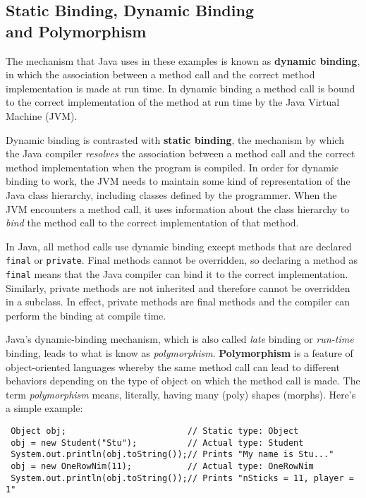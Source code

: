 \subsection{Static Binding, Dynamic Binding \\and Polymorphism}

The mechanism that Java uses in these examples is known as {\bf
dynamic binding}, in which the association between a method call and
the correct method implementation is made at run time. In dynamic
binding a method call is bound to the correct implementation of the
method at run time by the Java Virtual Machine (JVM).

Dynamic binding is contrasted with {\bf static binding}, the mechanism
by which the Java compiler {\em resolves} the association between a
method call and the correct method implementation when the program is
compiled. In order for dynamic binding to work, the JVM needs to
maintain some kind of representation of the Java class hierarchy,
including classes defined by the programmer.  When the JVM encounters
a method call, it uses information about the class hierarchy to {\em
bind} the method call to the correct implementation of that method.

In Java, all method calls use dynamic binding except methods that are
declared {\tt final} or {\tt private}. Final methods cannot be
overridden, so declaring a method as {\tt final} means that the Java
compiler can bind it to the correct implementation.  Similarly,
private methods are not inherited and therefore cannot be overridden
in a subclass. In effect, private methods are final methods and the
compiler can perform the binding at compile time.

Java's dynamic-binding mechanism, which is also called {\em late}
binding or {\em run-time} binding, leads to what is know as {\em
polymorphism}.  {\bf Polymorphism} is a feature of object-oriented
languages whereby the same method call can lead to different behaviors
depending on the type of object on which the method call is made.  The
term {\em polymorphism} means, literally, having many (poly) shapes
(morphs).  Here's a simple example:

\begin{jjjlisting}[32pc]
\begin{lstlisting}
 Object obj;                        // Static type: Object
 obj = new Student("Stu");          // Actual type: Student
 System.out.println(obj.toString());// Prints "My name is Stu..."
 obj = new OneRowNim(11);           // Actual type: OneRowNim
 System.out.println(obj.toString());// Prints "nSticks = 11, player = 1"
\end{lstlisting}
\end{jjjlisting}

